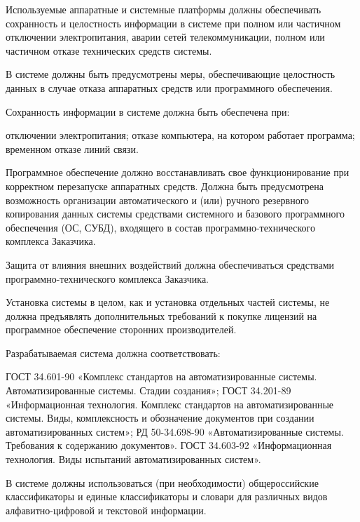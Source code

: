 \documentclass[russian, utf8, 12pt,pointsubsection,floatsubsection]{eskdtext}
\begin{document}
Используемые аппаратные и системные платформы должны обеспечивать сохранность и целостность информации в системе при полном или частичном отключении электропитания, аварии сетей телекоммуникации, полном или частичном отказе технических средств системы.

В системе должны быть предусмотрены меры, обеспечивающие целостность данных в случае отказа аппаратных средств или программного обеспечения.

Сохранность информации в системе должна быть обеспечена при:
\begin{enumerate}
отключении электропитания;
отказе компьютера, на котором работает программа;
временном отказе линий связи.
\end{enumerate}

Программное обеспечение должно восстанавливать свое функционирование при корректном перезапуске аппаратных средств. Должна быть предусмотрена возможность организации автоматического и (или) ручного резервного копирования данных системы средствами системного и базового программного обеспечения (ОС, СУБД), входящего в состав программно-технического комплекса Заказчика.

Защита от влияния внешних воздействий должна обеспечиваться средствами программно-технического комплекса Заказчика.

Установка системы в целом, как и установка отдельных частей системы, не должна предъявлять дополнительных требований к покупке лицензий на программное обеспечение сторонних производителей.

Разрабатываемая система должна соответствовать:
\begin{enumerate}
ГОСТ 34.601-90 «Комплекс стандартов на автоматизированные системы. Автоматизированные системы. Стадии создания»;
ГОСТ 34.201-89 «Информационная технология. Комплекс стандартов на автоматизированные системы. Виды, комплексность и обозначение документов при создании автоматизированных систем»;
РД 50-34.698-90 «Автоматизированные системы. Требования к содержанию документов».
ГОСТ 34.603-92 «Информационная технология. Виды испытаний автоматизированных систем».
\end{enumerate}

В системе должны использоваться (при необходимости) общероссийские классификаторы и единые классификаторы и словари для различных видов алфавитно-цифровой и текстовой информации.
\end{document}
